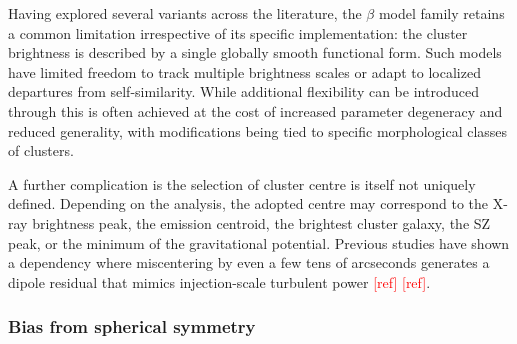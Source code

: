 Having explored several variants across the literature, the $\beta$ model family retains a common limitation irrespective of its specific implementation: the cluster brightness is described by a single globally smooth functional form. Such models have limited freedom to track multiple brightness scales or adapt to localized departures from self-similarity. While additional flexibility can be introduced through this is often achieved at the cost of increased parameter degeneracy and reduced generality, with modifications being tied to specific morphological classes of clusters.

A further complication is the selection of cluster centre is itself not uniquely defined. Depending on the analysis, the adopted centre may correspond to the X-ray brightness peak, the emission centroid, the brightest cluster galaxy, the SZ peak, or the minimum of the gravitational potential. Previous studies have shown a dependency where miscentering by even a few tens of arcseconds generates a dipole residual that mimics injection-scale turbulent power \textcolor{red}{[ref]} \textcolor{red}{[ref]}.

\subsubsection*{Bias from spherical symmetry}

